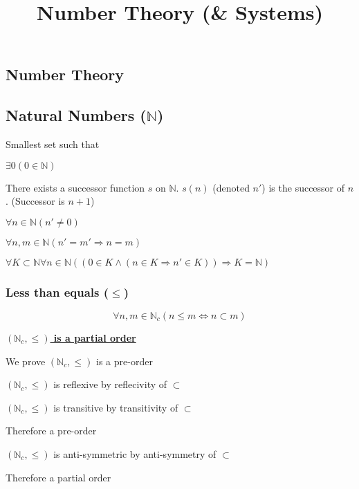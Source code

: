\documentclass[12pt]{article}
\title{\textbf{Number Theory (\& Systems)}}
\date{}
\begin{document}
\maketitle

\begin{spacing}{1.5}

\section{Number Theory}

\subsection{Natural Numbers ($\mathbb{N}$)}

Smallest set such that 

\begin{enumerate*}
	\item $\exists 0 (0 \in \mathbb{N})$
	\item There exists a successor function $s$ on $\mathbb{N}$. $s(n)$ (denoted $n'$) is the successor of $n$. (Successor is $n+1$)
	\item $\forall n \in \mathbb{N} (n' \neq 0)$
	\item $\forall n, m \in \mathbb{N} (n' = m' \Rightarrow n = m)$
	\item $\forall K \subset \mathbb{N} \forall n \in \mathbb{N} ((0 \in K \wedge (n \in K \Rightarrow n' \in K)) \Rightarrow K = \mathbb{N})$
\end{enumerate*}

\subsubsection{Less than equals ($\le$)}

$$
\forall n, m \in \mathbb{N}_c
(n \le m \Leftrightarrow n \subset m)
$$

\underline{\textbf{$(\mathbb{N}_c, \le)$ is a partial order}}

\begin{enumerate*}
	\item We prove $(\mathbb{N}_c, \le)$ is a pre-order
		\begin{enumerate*}
			\item $(\mathbb{N}_c, \le)$ is reflexive by reflecivity of $\subset$
			\item $(\mathbb{N}_c, \le)$ is transitive by transitivity of $\subset$
			\item Therefore a pre-order
		\end{enumerate*}
	\item $(\mathbb{N}_c, \le)$ is anti-symmetric by anti-symmetry of $\subset$
	\item Therefore a partial order
\end{enumerate*}


\end{spacing}
\end{document}
